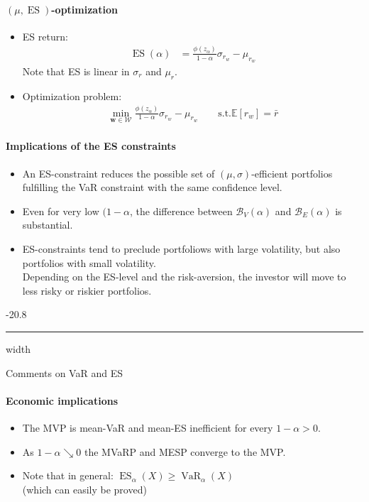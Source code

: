 \documentclass[a4paper,landscape,8pt,fleqn]{scrartcl}
\makeatletter
\renewcommand{\subsubsection}{\@startsection{subsubsection}{1}{0mm}%
{-2\baselineskip}{0.8\baselineskip}%
{\hrule depth 0.2pt width\columnwidth\vspace*{1.2em}\normalsize\bfseries}}
\DeclareMathOperator{\VaR}{VaR}				%
\DeclareMathOperator{\ES}{ES}					%
\makeatother
\begin{document}
\begin{multicols*}{3}
\paragraph{$(\mu, \ES)$-optimization}
\begin{itemize}
\item ES return:
\begin{align*}
\ES(\alpha) &= \frac{\phi(z_\alpha)}{1-\alpha} \sigma_{r_w} - \mu_{r_w}
\end{align*}
Note that ES is linear in $\sigma_r$ and $\mu_r$.
\item Optimization problem:
\begin{align*}
\min_{\bm w \in \mathcal{W}} \frac{\phi(z_\alpha)}{1-\alpha} \sigma_{r_w} - \mu_{r_w} \qquad \text{s.t.} \mathbb{E}[r_w] = \bar r
\end{align*}
\end{itemize}

\paragraph{Implications of the ES constraints}
\begin{itemize}
\item An ES-constraint reduces the possible set of $(\mu,\sigma)$-efficient portfolios fulfilling the VaR constraint with the same confidence level.
\item Even for very low $(1-\alpha$, the difference between $\mathcal{B}_V(\alpha)$ and $\mathcal{B}_E(\alpha)$ is substantial.
\item ES-constraints tend to preclude portfoliows with large volatility, but also portfolios with small volatility. \\
Depending on the ES-level and the risk-aversion, the investor will move to less risky or riskier portfolios.
\end{itemize}

\subsubsection{Comments on VaR and ES}

\paragraph{Economic implications}
\begin{itemize}
\item The MVP is mean-VaR and mean-ES inefficient for every $1-\alpha > 0$.
\item As $1-\alpha \searrow 0$ the MVaRP and MESP converge to the MVP.
\item Note that in general: $\ES_\alpha(X) \geq \VaR_\alpha(X)$ \\
(which can easily be proved)
\end{itemize}


\end{multicols*}
\end{document}
